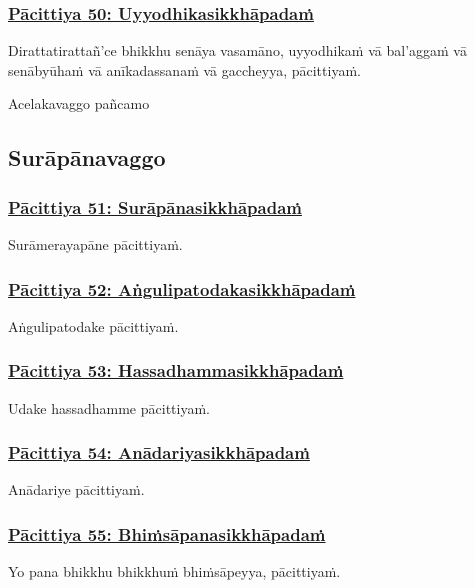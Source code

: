 \subsubsection*{\hyperref[exp50]{Pācittiya 50: Uyyodhikasikkhāpadaṁ}}
\label{pac50}
Dirattatirattañ'ce bhikkhu senāya vasamāno, uyyodhikaṁ vā bal'aggaṁ vā senābyūhaṁ vā anīkadassanaṁ vā gaccheyya, pācittiyaṁ.

\begin{center}
  Acelakavaggo pañcamo
\end{center}

\subsection{Surāpānavaggo}
\vspace{0.2cm}

\subsubsection*{\hyperref[exp51]{Pācittiya 51: Surāpānasikkhāpadaṁ}}
\label{pac51}
Surāmerayapāne pācittiyaṁ.

\subsubsection*{\hyperref[exp52]{Pācittiya 52: Aṅgulipatodakasikkhāpadaṁ}}
\label{pac52}
Aṅgulipatodake pācittiyaṁ.

\subsubsection*{\hyperref[exp53]{Pācittiya 53: Hassadhammasikkhāpadaṁ}}
\label{pac53}
Udake hassadhamme pācittiyaṁ.

\subsubsection*{\hyperref[exp54]{Pācittiya 54: Anādariyasikkhāpadaṁ}}
\label{pac54}
Anādariye pācittiyaṁ.

\subsubsection*{\hyperref[exp55]{Pācittiya 55: Bhiṁsāpanasikkhāpadaṁ}}
\label{pac55}
Yo pana bhikkhu bhikkhuṁ bhiṁsāpeyya, pācittiyaṁ.

